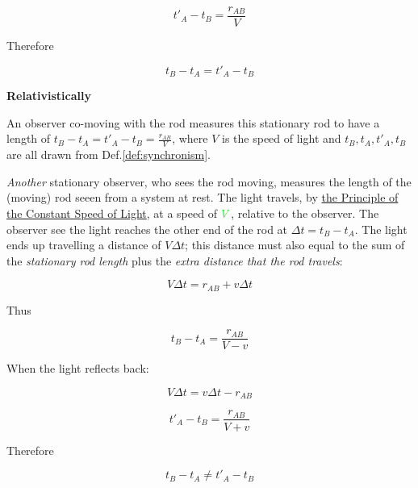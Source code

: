 \begin{tcolorbox}
    \begin{equation}
        t'_A - t_B = \frac{r_{AB}}{V}
    \end{equation}

    Therefore

    \begin{equation}
        t_B - t_A = t'_A - t_B
    \end{equation}

    \tcblower

    \begin{center}
        \textbf{Relativistically}
    \end{center}

    An observer co-moving with the rod measures this stationary rod to have a length of $t_B - t_A = t'_A - t_B = \frac{r_{AB}}{V}$, where $V$ is
    the speed of light and $t_B, t_A, t'_A, t_B$ are all drawn from Def.\ref{def:synchronism}.

    \textit{Another} stationary observer, who sees the rod moving, measures the length of the (moving) rod seeen from a
    system at rest. The light travels, by
    \hyperlink{constant-c-principle}{the Principle of the Constant Speed of Light}, at a speed of $ \color{green} V$,
    relative to the observer. The observer see the light reaches the other end of the rod at $\Delta t = t_B - t_A$. The
    light ends up travelling a distance of $V\Delta t$; this distance must also equal to the sum of the
    \textit{stationary rod length} plus the \textit{extra distance that the rod travels}:

    \begin{equation}
        V\Delta t = r_{AB} + v\Delta t
    \end{equation}

    Thus

    \begin{equation}\label{eq:forward-relativistic-propagation}
    t_B - t_A = \frac{r_{AB}}{V - v}
    \end{equation}

    When the light reflects back:

    \begin{equation}
        V\Delta t = v\Delta t - r_{AB}
    \end{equation}

    \begin{equation}\label{eq:backward-relativistic-propagation}
        t'_A - t_B = \frac{r_{AB}}{V + v}
    \end{equation}

    Therefore

    \begin{equation}
        t_B - t_A \ne t'_A - t_B
    \end{equation}
\end{tcolorbox}

